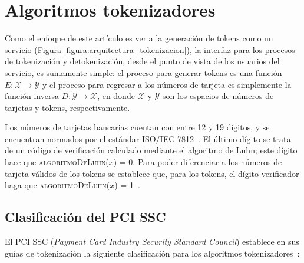 %
%

\section{Algoritmos tokenizadores}
\label{sec:algoritmos}

Como el enfoque de este artículo es ver a la generación de tokens como un
servicio (Figura \ref{figura:arquitectura_tokenizacion}), la interfaz para los
procesos de tokenización y detokenización, desde el punto de vista de los
usuarios del servicio, es sumamente simple: el proceso para generar tokens es
una función $ E: \mathcal{X} \rightarrow \mathcal{Y} $ y el proceso para
regresar a los números de tarjeta es simplemente la función inversa $ D:
\mathcal{Y} \rightarrow \mathcal{X} $, en donde $ \mathcal{X} $ y $ \mathcal{Y}
$ son los espacios de números de tarjetas y tokens, respectivamente.

Los números de tarjetas bancarias cuentan con entre 12 y 19 dígitos, y se
encuentran normados por el estándar ISO/IEC-7812~\cite{iso_7812}. El último
dígito se trata de un código de verificación calculado mediante el algoritmo de
Luhn; este dígito hace que \textsc{algoritmoDeLuhn($ x $) = 0}. Para poder
diferenciar a los números de tarjeta válidos de los tokens se establece que,
para los tokens, el dígito verificador haga que
\textsc{algoritmoDeLuhn($ x $) = 1}~\cite{doc_sandra}.


\subsection{Clasificación del PCI SSC}
\label{sec:clasificacion}

El PCI SSC (\textit{Payment Card Industry Security Standard Council}) establece
en sus guías de tokenización la siguiente clasificación para los algoritmos
tokenizadores~\cite{pci_tokens}:

